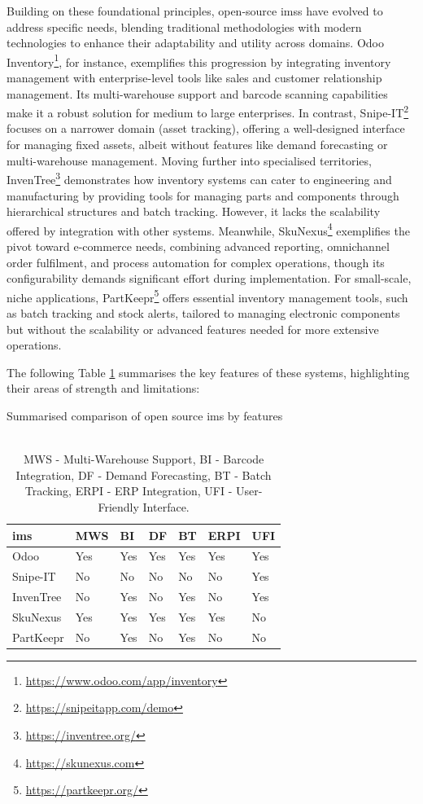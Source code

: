 Building on these foundational principles, open-source \acp{ims} have evolved to address specific needs, blending traditional methodologies with modern technologies to enhance their adaptability and utility across domains. Odoo Inventory\footnote{\url{https://www.odoo.com/app/inventory}}, for instance, exemplifies this progression by integrating inventory management with enterprise-level tools like sales and customer relationship management. Its multi-warehouse support and barcode scanning capabilities make it a robust solution for medium to large enterprises. In contrast, Snipe-IT\footnote{\url{https://snipeitapp.com/demo}} focuses on a narrower domain (asset tracking), offering a well-designed interface for managing fixed assets, albeit without features like demand forecasting or multi-warehouse management. Moving further into specialised territories, InvenTree\footnote{\url{https://inventree.org/}} demonstrates how inventory systems can cater to engineering and manufacturing by providing tools for managing parts and components through hierarchical structures and batch tracking. However, it lacks the scalability offered by integration with other systems. Meanwhile, SkuNexus\footnote{\url{https://skunexus.com}} exemplifies the pivot toward e-commerce needs, combining advanced reporting, omnichannel order fulfilment, and process automation for complex operations, though its configurability demands significant effort during implementation. For small-scale, niche applications, PartKeepr\footnote{\url{https://partkeepr.org/}} offers essential inventory management tools, such as batch tracking and stock alerts, tailored to managing electronic components but without the scalability or advanced features needed for more extensive operations.

The following Table \ref{tab:ims_comparison} summarises the key features of these systems, highlighting their areas of strength and limitations:

\begin{table}[!htb]
\centering
\caption{Summarised comparison of open source \acl{ims} by features}
\begin{tabular}{lllllll}
\hline
\textbf{\ac{ims}} & \textbf{MWS} & \textbf{BI} & \textbf{DF} & \textbf{BT} & \textbf{ERPI} & \textbf{UFI} \\
\hline
Odoo & Yes & Yes & Yes & Yes & Yes & Yes \\
\hline
Snipe-IT & No & No & No & No & No & Yes \\
\hline
InvenTree & No & Yes & No & Yes & No & Yes \\
\hline
SkuNexus & Yes & Yes & Yes & Yes & Yes & No \\
\hline
PartKeepr & No & Yes & No & Yes & No & No \\
\hline
\end{tabular}
\caption*{\\MWS - Multi-Warehouse Support, BI - Barcode Integration, DF - Demand Forecasting, BT - Batch Tracking, ERPI - ERP Integration, UFI - User-Friendly Interface.}
\label{tab:ims_comparison}
\end{table}



